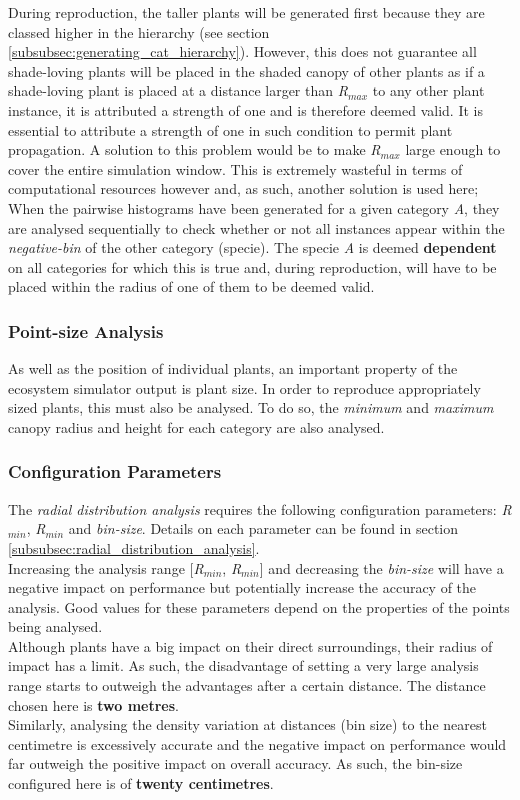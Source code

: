 During reproduction, the taller plants will be generated first because they are classed higher in the hierarchy (see section \ref{subsubsec:generating_cat_hierarchy}). However, this does not guarantee all shade-loving plants will be placed in the shaded canopy of other plants as if a shade-loving plant is placed at a distance larger than \textit{R$_{max}$} to any other plant instance, it is attributed a strength of one and is therefore deemed valid. It is essential to attribute a strength of one in such condition to permit plant propagation. A solution to this problem would be to make \textit{R$_{max}$} large enough to cover the entire simulation window. This is extremely wasteful in terms of computational resources however and, as such, another solution is used here; When the pairwise histograms have been generated for a given category \textit{A}, they are analysed sequentially to check whether or not all instances appear within the \textit{negative-bin} of the other category (specie). The specie \textit{A} is deemed \textbf{dependent} on all categories for which this is true and, during reproduction, will have to be placed within the radius of one of them to be deemed valid.

\subsubsection{Point-size Analysis}

As well as the position of individual plants, an important property of the ecosystem simulator output is plant size. In order to reproduce appropriately sized plants, this must also be analysed. To do so, the \textit{minimum} and \textit{maximum} canopy radius and height for each category are also analysed.

\subsubsection{Configuration Parameters}

The \textit{radial distribution analysis} requires the following configuration parameters: \textit{R$_{min}$}, \textit{R$_{min}$} and \textit{bin-size}. Details on each parameter can be found in section \ref{subsubsec:radial_distribution_analysis}.\\

Increasing the analysis range [\textit{R$_{min}$}, \textit{R$_{min}$}] and decreasing the \textit{bin-size} will have a negative impact on performance but potentially increase the accuracy of the analysis. Good values for these parameters depend on the properties of the points being analysed.\\
Although plants have a big impact on their direct surroundings, their radius of impact has a limit. As such, the disadvantage of setting a very large analysis range starts to outweigh the advantages after a certain distance. The distance chosen here is \textbf{two metres}.\\
Similarly, analysing the density variation at distances (bin size) to the nearest centimetre is excessively accurate and the negative impact on performance would far outweigh the positive impact on overall accuracy. As such, the bin-size configured here is of \textbf{twenty centimetres}.

